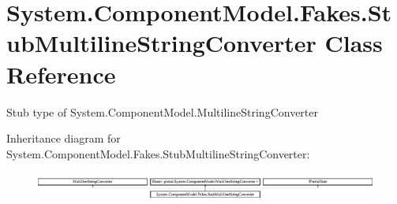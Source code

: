 \hypertarget{class_system_1_1_component_model_1_1_fakes_1_1_stub_multiline_string_converter}{\section{System.\-Component\-Model.\-Fakes.\-Stub\-Multiline\-String\-Converter Class Reference}
\label{class_system_1_1_component_model_1_1_fakes_1_1_stub_multiline_string_converter}
}


Stub type of System.\-Component\-Model.\-Multiline\-String\-Converter 


Inheritance diagram for System.\-Component\-Model.\-Fakes.\-Stub\-Multiline\-String\-Converter\-:\begin{figure}[H]
\begin{center}
\leavevmode
\includegraphics[height=0.949958cm]{class_system_1_1_component_model_1_1_fakes_1_1_stub_multiline_string_converter}
\end{center}
\end{figure}
